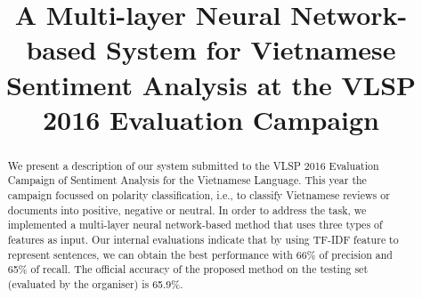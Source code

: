 \documentclass[conference,compsoc]{IEEEtran}
\begin{document}
%
\title{A Multi-layer Neural Network-based System for Vietnamese Sentiment Analysis at the VLSP 2016 Evaluation Campaign\\}


\author{
}



\maketitle

\begin{abstract}
We present a description of our system submitted to the VLSP 2016 Evaluation Campaign of Sentiment Analysis for the Vietnamese Language. This year the campaign focussed on polarity classification, i.e., to classify Vietnamese reviews or documents into positive, negative or neutral. In order to address the task, we implemented a multi-layer neural network-based method that uses three types of features as input. Our internal evaluations indicate that by using TF-IDF feature to represent sentences, we can obtain the best performance with 66\% of precision and 65\% of recall. The official accuracy of the proposed method on the testing set (evaluated by the organiser) is 65.9\%.
\end{abstract}


\IEEEpeerreviewmaketitle
\end{document}
